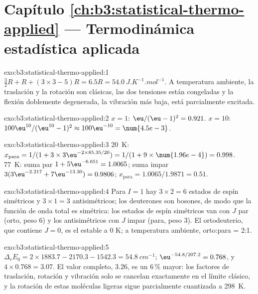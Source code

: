 \section*{Capítulo \ref{ch:b3:statistical-thermo-applied} --- Termodinámica estadística aplicada}

\begin{solution}{exo:b3:statistical-thermo-applied:1}
$\frac32R + R + (3 \times 3 - 5)R = 6.5R = \qty{54.0}{J.K^{-1}.mol^{-1}}$. A temperatura ambiente, la traslación
y la rotación son clásicas, las dos tensiones están congeladas y la flexión doblemente
degenerada, la vibración más baja, está parcialmente excitada.
\end{solution}

\begin{solution}{exo:b3:statistical-thermo-applied:2}
$x = 1$: $\eu/(\eu - 1)^2 = 0.921$. $x = 10$: $100\eu^{10}/(\eu^{10} - 1)^2 \approx 100\eu^{-10} = \num{4.5e-3}$.
\end{solution}

\begin{solution}{exo:b3:statistical-thermo-applied:3}
\qty{20}{K}: $x_{\mathrm{para}} = 1/(1 + 3 \times 3\eu^{-2 \times 85.35/20}) = 1/(1 + 9 \times \num{1.96e-4}) = 0.998$.
\qty{77}{K}: suma par $1 + 5\eu^{-6.651} = 1.0065$; suma impar $3(3\eu^{-2.217} + 7\eu^{-13.30}) = 0.9806$;
$x_{\mathrm{para}} = 1.0065/1.9871 = 0.51$.
\end{solution}

\begin{solution}{exo:b3:statistical-thermo-applied:4}
Para $I = 1$ hay $3 \times 2 = 6$ estados de espín simétricos y $3 \times 1 = 3$ antisimétricos;
los deuterones son bosones, de modo que la función de onda total es simétrica: los estados de espín
simétricos van con $J$ par (orto, peso 6) y los antisimétricos con $J$ impar (para, peso
3). El ortodeuterio, que contiene $J = 0$, es el estable a 0 K; a temperatura ambiente,
orto:para = 2:1.
\end{solution}

\begin{solution}{exo:b3:statistical-thermo-applied:5}
$\Delta_rE_0 = 2 \times 1883.7 - 2170.3 - 1542.3 = \qty{54.8}{cm^{-1}}$; $\eu^{-54.8/207.2} = 0.768$, y
$4 \times 0.768 = 3.07$. El valor completo, 3.26, es un 6\,\% mayor: los factores de traslación, rotación y
vibración solo se cancelan exactamente en el límite clásico, y la
rotación de estas moléculas ligeras sigue parcialmente cuantizada a \qty{298}{K}.
\end{solution}

